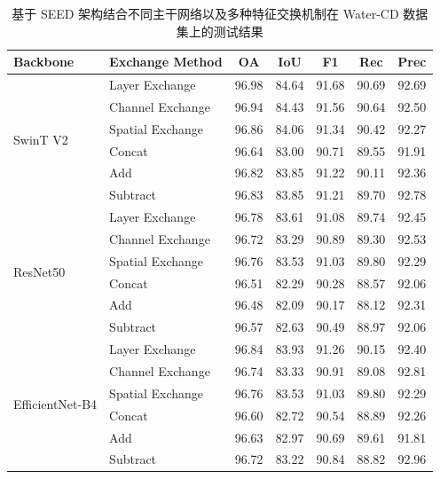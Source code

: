 \begin{table}[!htbp]
\centering
\caption{基于 SEED 架构结合不同主干网络以及多种特征交换机制在 Water-CD 数据集上的测试结果}
\label{tab:seed_watercd_backbone}
\begin{tabular}{l l c c c c c}
\hline
\textbf{Backbone} & \textbf{Exchange Method} & \textbf{OA} & \textbf{IoU} & \textbf{F1} & \textbf{Rec} & \textbf{Prec} \\
\hline
\multirow{6}{*}{SwinT V2} 
 & Layer Exchange    & 96.98 & 84.64 & 91.68 & 90.69 & 92.69 \\
 & Channel Exchange  & 96.94 & 84.43 & 91.56 & 90.64 & 92.50 \\
 & Spatial Exchange  & 96.86 & 84.06 & 91.34 & 90.42 & 92.27 \\
\cline{2-7}
 & Concat            & 96.64 & 83.00 & 90.71 & 89.55 & 91.91 \\
 & Add               & 96.82 & 83.85 & 91.22 & 90.11 & 92.36 \\ 
 & Subtract             & 96.83 & 83.85 & 91.21 & 89.70 & 92.78 \\
\hline
\multirow{6}{*}{ResNet50} 
 & Layer Exchange    & 96.78 & 83.61 & 91.08 & 89.74 & 92.45 \\
 & Channel Exchange  & 96.72 & 83.29 & 90.89 & 89.30 & 92.53 \\
 & Spatial Exchange  & 96.76 & 83.53 & 91.03 & 89.80 & 92.29 \\
\cline{2-7}
 & Concat            & 96.51 & 82.29 & 90.28 & 88.57 & 92.06 \\
 & Add               & 96.48 & 82.09 & 90.17 & 88.12 & 92.31 \\
 & Subtract             & 96.57 & 82.63 & 90.49 & 88.97 & 92.06 \\
\hline
\multirow{6}{*}{EfficientNet-B4} 
 & Layer Exchange    & 96.84 & 83.93 & 91.26 & 90.15 & 92.40 \\
 & Channel Exchange  & 96.74 & 83.33 & 90.91 & 89.08 & 92.81 \\
 & Spatial Exchange  & 96.76 & 83.53 & 91.03 & 89.80 & 92.29 \\
\cline{2-7}
 & Concat            & 96.60	& 82.72	& 90.54	& 88.89	& 92.26 \\
 & Add               & 96.63	& 82.97	& 90.69	& 89.61	& 91.81 \\
 & Subtract          & 96.72	& 83.22	& 90.84	& 88.82	& 92.96 \\

\hline
\end{tabular}
\end{table}

